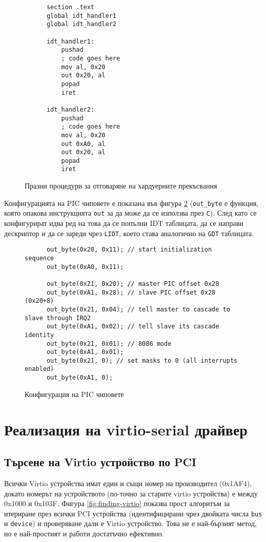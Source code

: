   \begin{figure}[htpb]
    \centering
    \begin{verbatim}
      section .text
      global idt_handler1
      global idt_handler2

      idt_handler1:
          pushad
          ; code goes here
          mov al, 0x20
          out 0x20, al
          popad
          iret

      idt_handler2:
          pushad
          ; code goes here
          mov al, 0x20
          out 0xA0, al
          out 0x20, al
          popad
          iret
    \end{verbatim}
    \caption{Празни процедури за отговаряне на хардуерните прекъсвания}
    \label{fig:irqhandlers}
  \end{figure}

  Конфигурацията на PIC чиповете е показана във фигура \ref{fig:picconfig} ({\tt out\_byte} е функция, която опакова инструкцията {\tt out} за да може да се използва през {\tt C}). След като се конфигурират идва ред на това да се попълни IDT таблицата, да се направи дескриптор и да се зареди чрез {\tt LIDT}, което става аналогично на {\tt GDT} таблицата.

  \begin{figure}[htpb]
    \centering
    \begin{verbatim}
      out_byte(0x20, 0x11); // start initialization sequence
      out_byte(0xA0, 0x11);

      out_byte(0x21, 0x20); // master PIC offset 0x20
      out_byte(0xA1, 0x28); // slave PIC offset 0x28 (0x20+8)
      out_byte(0x21, 0x04); // tell master to cascade to slave through IRQ2
      out_byte(0xA1, 0x02); // tell slave its cascade identity
      out_byte(0x21, 0x01); // 8086 mode
      out_byte(0xA1, 0x01);
      out_byte(0x21, 0); // set masks to 0 (all interrupts enabled)
      out_byte(0xA1, 0);
    \end{verbatim}
    \caption{Конфигурация на PIC чиповете}
    \label{fig:picconfig}
  \end{figure}

\section{Реализация на virtio-serial драйвер}
  \subsection{Търсене на Virtio устройство по PCI}
  Всички Virtio устройства имат един и същи номер на производител (0x1AF4), докато номерът на устройството (по-точно за старите virtio устройства) е между 0x1000 и 0x103F.\cite[глава~4.1.2]{virtiodocs} Фигура \ref{fig:finding-virtio} показва прост алгоритъм за итериране през всички PCI устройства (идентифицирани чрез двойката числа {\tt bus} и {\tt device}) и проверяване дали е Virtio устройство. Това не е най-бързият метод, но е най-простият и работи достатъчно ефективно.

